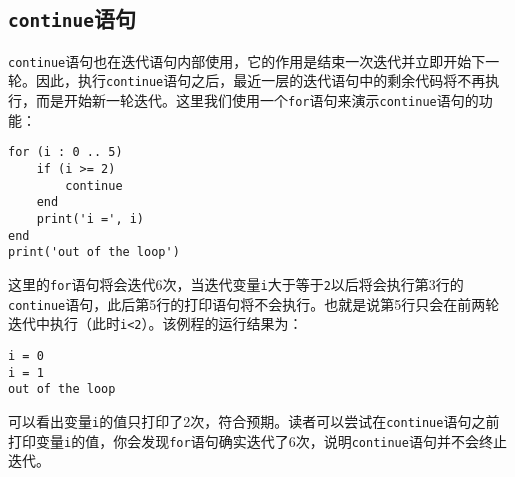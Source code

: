 \subsection{\texttt{continue}语句}

\texttt{continue}语句也在迭代语句内部使用，它的作用是结束一次迭代并立即开始下一轮。因此，执行\texttt{continue}语句之后，最近一层的迭代语句中的剩余代码将不再执行，而是开始新一轮迭代。这里我们使用一个\texttt{for}语句来演示\texttt{continue}语句的功能：
\begin{lstlisting}[language=berry]
for (i : 0 .. 5)
    if (i >= 2)
        continue
    end
    print('i =', i)
end
print('out of the loop')
\end{lstlisting}
这里的\texttt{for}语句将会迭代6次，当迭代变量\texttt{i}大于等于\texttt{2}以后将会执行第3行的\texttt{continue}语句，此后第5行的打印语句将不会执行。也就是说第5行只会在前两轮迭代中执行（此时\texttt{i<2}）。该例程的运行结果为：
\begin{lstlisting}[numbers=none]
i = 0
i = 1
out of the loop
\end{lstlisting}
可以看出变量\texttt{i}的值只打印了2次，符合预期。读者可以尝试在\texttt{continue}语句之前打印变量\texttt{i}的值，你会发现\texttt{for}语句确实迭代了6次，说明\texttt{continue}语句并不会终止迭代。
